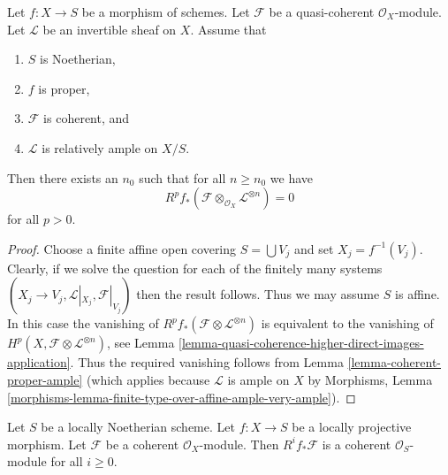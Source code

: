 \begin{lemma}
\label{lemma-kill-by-twisting}
Let $f : X \to S$ be a morphism of schemes.
Let $\mathcal{F}$ be a quasi-coherent $\mathcal{O}_X$-module.
Let $\mathcal{L}$ be an invertible sheaf on $X$.
Assume that
\begin{enumerate}
\item $S$ is Noetherian,
\item $f$ is proper,
\item $\mathcal{F}$ is coherent, and
\item $\mathcal{L}$ is relatively ample on $X/S$.
\end{enumerate}
Then there exists an $n_0$ such that for all $n \geq n_0$
we have
$$
R^pf_*\left(\mathcal{F} \otimes_{\mathcal{O}_X} \mathcal{L}^{\otimes n}\right)
=
0
$$
for all $p > 0$.
\end{lemma}

\begin{proof}
Choose a finite affine open covering $S = \bigcup V_j$ and
set $X_j = f^{-1}(V_j)$.
Clearly, if we solve the question for each of the finitely many
systems $(X_j \to V_j, \mathcal{L}|_{X_j}, \mathcal{F}|_{V_j})$
then the result follows. Thus we may assume $S$ is affine.
In this case the vanishing of
$R^pf_*(\mathcal{F} \otimes \mathcal{L}^{\otimes n})$
is equivalent to the vanishing of
$H^p(X, \mathcal{F} \otimes \mathcal{L}^{\otimes n})$, see
Lemma \ref{lemma-quasi-coherence-higher-direct-images-application}.
Thus the required vanishing follows
from Lemma \ref{lemma-coherent-proper-ample} (which applies because
$\mathcal{L}$ is ample on $X$ by Morphisms, Lemma
\ref{morphisms-lemma-finite-type-over-affine-ample-very-ample}).
\end{proof}

\begin{lemma}
\label{lemma-locally-projective-pushforward}
Let $S$ be a locally Noetherian scheme.
Let $f : X \to S$ be a locally projective morphism.
Let $\mathcal{F}$ be a coherent $\mathcal{O}_X$-module.
Then $R^if_*\mathcal{F}$ is a coherent $\mathcal{O}_S$-module
for all $i \geq 0$.
\end{lemma}

